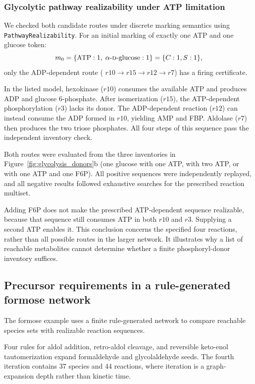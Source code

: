 \documentclass[pdflatex,referee]{../template/sn-jnl}
\theoremstyle{plain}%
\theoremstyle{definition}%
\theoremstyle{remark}%
\begin{document}
\subsubsection{Glycolytic pathway realizability under ATP limitation}

We checked both candidate routes under discrete marking semantics using \texttt{PathwayRealizability}. For an initial marking of exactly one ATP and one glucose token:
\begin{equation}
m_0 = \{\text{ATP}: 1, \; \alpha\text{-\textsc{d}-glucose}: 1\} = \{C:1, S:1\},
\end{equation}
only the ADP-dependent route ( $r10 \to r15 \to r12 \to r7$) has a firing certificate.

In the listed model, hexokinase ($r10$) consumes the available ATP and produces ADP and glucose 6-phosphate. After isomerization ($r15$), the ATP-dependent phosphorylation ($r3$) lacks its donor. The ADP-dependent reaction ($r12$) can instead consume the ADP formed in $r10$, yielding AMP and FBP. Aldolase ($r7$) then produces the two triose phosphates. All four steps of this sequence pass the independent inventory check.

Both routes were evaluated from the three inventories in Figure~\ref{fig:glycolysis_donors}b (one glucose with one ATP, with two ATP, or with one ATP and one F6P). All positive sequences were independently replayed, and all negative results followed exhaustive searches for the prescribed reaction multiset.

Adding F6P does not make the prescribed ATP-dependent sequence realizable, because that sequence still consumes ATP in both $r10$ and $r3$. Supplying a second ATP enables it. This conclusion concerns the specified four reactions, rather than all possible routes in the larger network. It illustrates why a list of reachable metabolites cannot determine whether a finite phosphoryl-donor inventory suffices.

\subsection{Precursor requirements in a rule-generated formose network}
\label{sec:si_case_formose}

The formose example uses a finite rule-generated network to compare reachable species sets with realizable reaction sequences.

Four rules for aldol addition, retro-aldol cleavage, and reversible keto-enol tautomerization expand formaldehyde and glycolaldehyde seeds. The fourth iteration contains 37 species and 44 reactions, where iteration is a graph-expansion depth rather than kinetic time.
\end{document}
